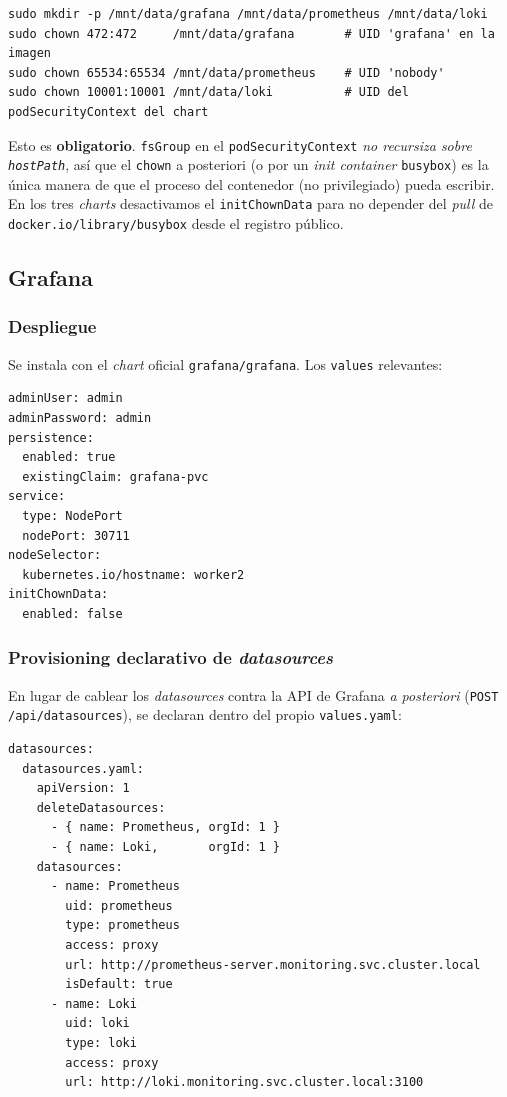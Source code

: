\begin{lstlisting}[style=bash]
sudo mkdir -p /mnt/data/grafana /mnt/data/prometheus /mnt/data/loki
sudo chown 472:472     /mnt/data/grafana       # UID 'grafana' en la imagen
sudo chown 65534:65534 /mnt/data/prometheus    # UID 'nobody'
sudo chown 10001:10001 /mnt/data/loki          # UID del podSecurityContext del chart
\end{lstlisting}

Esto es \textbf{obligatorio}. \texttt{fsGroup} en el \texttt{podSecurityContext} \emph{no recursiza sobre \texttt{hostPath}}, así que el \texttt{chown} a posteriori (o por un \emph{init container} \texttt{busybox}) es la única manera de que el proceso del contenedor (no privilegiado) pueda escribir. En los tres \emph{charts} desactivamos el \texttt{initChownData} para no depender del \emph{pull} de \texttt{docker.io/library/busybox} desde el registro público.

\subsection{Grafana}

\subsubsection{Despliegue}

Se instala con el \emph{chart} oficial \texttt{grafana/grafana}. Los \texttt{values} relevantes:

\begin{lstlisting}[style=yaml]
adminUser: admin
adminPassword: admin
persistence:
  enabled: true
  existingClaim: grafana-pvc
service:
  type: NodePort
  nodePort: 30711
nodeSelector:
  kubernetes.io/hostname: worker2
initChownData:
  enabled: false
\end{lstlisting}

\subsubsection{Provisioning declarativo de \emph{datasources}}

En lugar de cablear los \emph{datasources} contra la API de Grafana \emph{a posteriori} (\texttt{POST /api/datasources}), se declaran dentro del propio \texttt{values.yaml}:

\begin{lstlisting}[style=yaml]
datasources:
  datasources.yaml:
    apiVersion: 1
    deleteDatasources:
      - { name: Prometheus, orgId: 1 }
      - { name: Loki,       orgId: 1 }
    datasources:
      - name: Prometheus
        uid: prometheus
        type: prometheus
        access: proxy
        url: http://prometheus-server.monitoring.svc.cluster.local
        isDefault: true
      - name: Loki
        uid: loki
        type: loki
        access: proxy
        url: http://loki.monitoring.svc.cluster.local:3100
\end{lstlisting}


